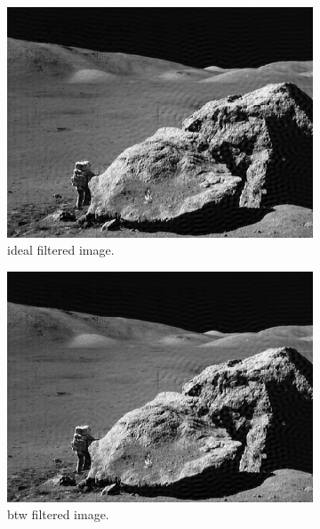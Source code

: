 \documentclass[14pt]{article}
\begin{document}
	\begin{figure}[hbt!]
		\centering
		\begin{subfigure}[b]{0.3\linewidth}
			\includegraphics[width=\linewidth]{ideal_image_man.png}
			\caption{ideal filtered image.}
		\end{subfigure}
		\begin{subfigure}[b]{0.3\linewidth}
			\includegraphics[width=\linewidth]{btw_image_man.png}
			\caption{btw filtered image.}
		\end{subfigure}
		\begin{subfigure}[b]{0.3\linewidth}

\end{subfigure}
\end{figure}
\end{document}
